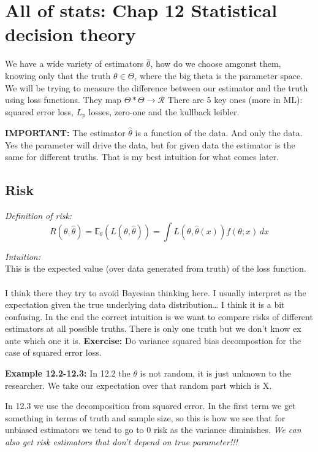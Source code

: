 \documentclass{article}
\begin{document}
\section{All of stats: Chap 12 Statistical decision theory}

We have a wide variety of estimators $\hat{\theta}$, how do we choose amgonst them, knowing only that the truth $\theta \in \Theta$, where the big theta is
the parameter space. 
We will be trying to measure the difference between our estimator and the truth using loss functions.
They map $\Theta * \Theta \rightarrow \mathcal{R} $
There are 5 key ones (more in ML): squared error loss, $L_p$ losses, zero-one and the kullback leibler.

\textbf{IMPORTANT:} The estimator $\hat{\theta}$ is a function of the data. And only the data. Yes the parameter will drive the data,
but for given data the estimator is the same for different truths. That is my best intuition for what comes later.

\subsection{Risk}

\textit{Definition of risk:}
$$R(\theta,\hat{\theta}) = \mathbb{E}_{\theta} (L(\theta,\hat{\theta})) = \int L(\theta,\hat{\theta}(x)) f(\theta;x)  \,dx   $$

\textit{Intuition:}\\
This is the expected value (over data generated from truth) of the loss function.
\\\\
I think there they try to avoid Bayesian thinking here. I usually interpret as the expectation given  the true underlying data distribution\dots
I think it is a bit confusing. In the end the correct intuition is we want to compare risks of different estimators at 
all possible truths. There is only one truth but we don't know ex ante which one it is.
\textbf{Exercise:}
Do variance squared bias decompostion for the case of squared error loss.

\textbf{Example 12.2-12.3:}
In 12.2 the $\theta$ is not random, it is just unknown to the researcher. We take our expectation over that random part which is X.

In 12.3 we use the decomposition from squared error. In the first term we get something in terms of truth and sample size, so this is how we see that for unbiased
estimators we tend to go to 0 risk as the variance diminishes.
\textit{We can also get risk estimators that don't depend on true parameter!!!}
\end{document}

